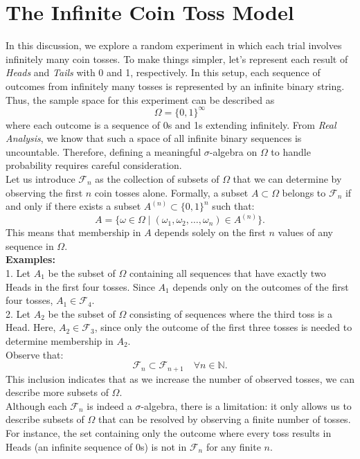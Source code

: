 \section{The Infinite Coin Toss Model}

In this discussion, we explore a random experiment in which each trial involves infinitely many coin tosses. To make things simpler, let's represent each result of \textit{Heads} and \textit{Tails} with 0 and 1, respectively. In this setup, each sequence of outcomes from infinitely many tosses is represented by an infinite binary string. Thus, the sample space for this experiment can be described as 
\[
\Omega = \{0, 1\}^{\infty}
\]
where each outcome is a sequence of 0s and 1s extending infinitely. From \textit{Real Analysis}, we know that such a space of all infinite binary sequences is uncountable. Therefore, defining a meaningful $\sigma$-algebra on $\Omega$ to handle probability requires careful consideration.\\

Let us introduce $\mathcal{F}_n$ as the collection of subsets of $\Omega$ that we can determine by observing the first $n$ coin tosses alone. Formally, a subset \( A \subset \Omega \) belongs to \( \mathcal{F}_n \) if and only if there exists a subset \( A^{(n)} \subset \{0,1\}^n \) such that:
\[
A = \{\omega \in \Omega \mid (\omega_1, \omega_2, \ldots, \omega_n) \in A^{(n)}\}.
\]
This means that membership in \( A \) depends solely on the first $n$ values of any sequence in $\Omega$.\\

\textbf{Examples:}\\

1. Let \( A_1 \) be the subset of $\Omega$ containing all sequences that have exactly two Heads in the first four tosses. Since \( A_1 \) depends only on the outcomes of the first four tosses, \( A_1 \in \mathcal{F}_4 \).\\
2. Let \( A_2 \) be the subset of $\Omega$ consisting of sequences where the third toss is a Head. Here, \( A_2 \in \mathcal{F}_3 \), since only the outcome of the first three tosses is needed to determine membership in \( A_2 \).\\

Observe that:
\[
\mathcal{F}_n \subset \mathcal{F}_{n+1} \quad \forall n \in \mathbb{N}.
\]
This inclusion indicates that as we increase the number of observed tosses, we can describe more subsets of $\Omega$.\\

Although each $\mathcal{F}_n$ is indeed a $\sigma$-algebra, there is a limitation: it only allows us to describe subsets of $\Omega$ that can be resolved by observing a finite number of tosses. For instance, the set containing only the outcome where every toss results in Heads (an infinite sequence of 0s) is not in $\mathcal{F}_n$ for any finite $n$.\\

